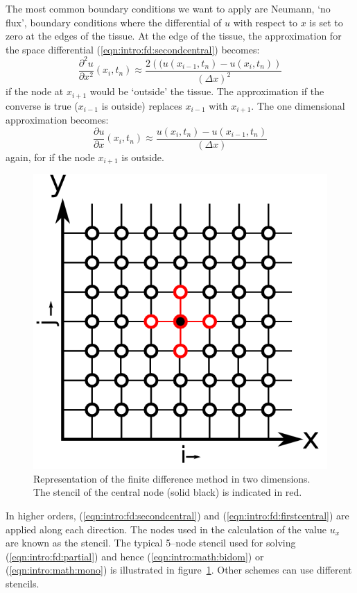 The most common boundary conditions we want to apply are Neumann, `no flux',
boundary conditions where the differential of $u$ with respect to $x$ is set to
zero at the edges of the tissue.
At the edge of the tissue, the approximation for the space differential
(\ref{eqn:intro:fd:secondcentral}) becomes:
\begin{equation}
\label{eqn:intro:fd:secondcentralboundary}
\frac{\partial^2 u}{\partial x^2}\left(x_i, t_n\right) \approx \frac{2\left((u(x_{i-1},t_n) - u(x_{i},t_n) \right)  }{\left(\Delta x\right)^2}
\end{equation}
if the node at $x_{i+1}$ would be `outside' the tissue.
The approximation if the converse is true ($x_{i-1}$ is outside) replaces
$x_{i-1}$ with $x_{i+1}$.
The one dimensional approximation becomes:
\begin{equation}
\label{eqn:intro:fd:firstcentralboundary}
\frac{\partial u}{\partial x}\left(x_i, t_n\right) \approx \frac{u(x_{i},t_n) - u(x_{i-1},t_n) }{\left(\Delta x\right)}
\end{equation}
again, for if the node $x_{i+1}$ is outside.
\begin{figure}
\begin{center}
\includegraphics{figures/intro/stencil}
\end{center}
\caption[5--node Stencil for the Finite Difference Method]{
\label{fig:intro:math:stencil}
Representation of the finite difference method in two dimensions.
The stencil of the central node (solid black) is indicated in red.
}
\end{figure}
In higher orders, (\ref{eqn:intro:fd:secondcentral}) and
(\ref{eqn:intro:fd:firstcentral}) are applied along each direction.
The nodes used in the calculation of the value $u_x$ are known as the stencil.
The typical 5--node stencil used for solving (\ref{eqn:intro:fd:partial}) and
hence (\ref{eqn:intro:math:bidom}) or (\ref{eqn:intro:math:mono}) is illustrated
in figure~\ref{fig:intro:math:stencil}.
Other schemes can use different stencils.


